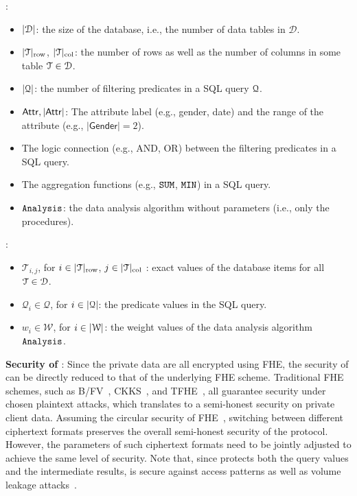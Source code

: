 : 
\begin{itemize}
    \item $\lvert {\mathcal{D}} \rvert$:
    the size of the database, i.e., the number of data tables in $\mathcal{D}$.
    \item $|\mathcal{T}|_{\rm row}$, $|\mathcal{T}|_{\rm col}$:
    the number of rows as well as the number of columns in some
    table $\mathcal{T}\in\mathcal{D}$. 
    \item $\lvert {\mathcal{Q}} \rvert$: 
    the number of filtering predicates in a SQL query $\mathcal{Q}$.
    \item $\mathsf{Attr}, |\mathsf{Attr}|$: The attribute label (e.g., gender, date)
    and the range of the attribute (e.g., $|\mathsf{Gender}|=2$).
    \item The logic connection (e.g., AND, OR) between the filtering predicates in a SQL query.
    \item The aggregation functions (e.g., $\texttt{SUM}$, $\texttt{MIN}$) in a SQL query. 
    \item $\texttt{Analysis}$: the data analysis algorithm without parameters (i.e., only the procedures).
\end{itemize}

: %
\begin{itemize}
    \item $\mathcal{T}_{i, j}$,
    for $i \in |\mathcal{T}|_{\rm row}$, $j \in |\mathcal{T}|_{\rm col}$
    : exact values of the database items for all $\mathcal{T}\in\mathcal{D}$.%
    \item $\mathcal{Q}_i \in \mathcal{Q}$, for $i \in \lvert {\mathcal{Q}} \rvert$: 
    the predicate values in the SQL query.
    \item $w_i \in \mathcal{W}$, for $i \in \lvert {\mathcal{W}} \rvert$: 
    the weight values of the data analysis algorithm $\texttt{Analysis}$.
\end{itemize}

{\bf{Security of \NAME}}: Since the private data are all encrypted using
FHE, the security of \NAME can be directly 
reduced to that of the underlying FHE scheme.
Traditional FHE schemes, such as B/FV~\cite{DBLP:conf/crypto/brakerski12}, CKKS~\cite{DBLP:conf/asiacrypt/CheonKKS17}, and TFHE~\cite{DBLP:journals/joc/ChillottiGGI20}, 
all guarantee security under chosen plaintext attacks, 
which translates to a semi-honest security 
on private client data.
Assuming the circular security of FHE~\cite{DBLP:conf/innovations/bgv12}, 
switching between different ciphertext formats preserves 
the overall semi-honest security of the protocol.
However, the parameters of such ciphertext formats 
need to be jointly adjusted to achieve the same level of security.
Note that, since \NAME protects both the query values
and the intermediate results, \NAME is secure
against access patterns as well as volume leakage attacks~\cite{attackSOD}.

